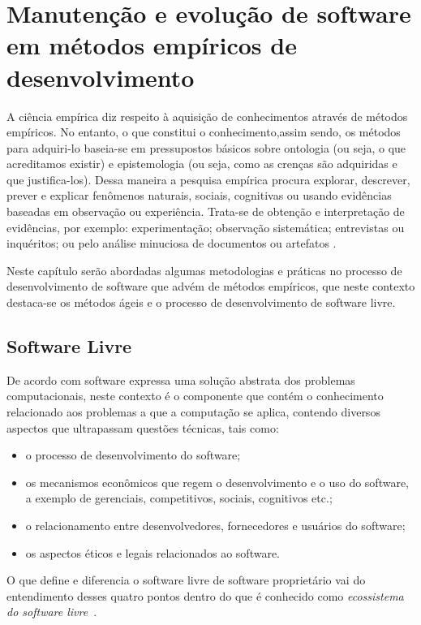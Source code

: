 \section{Manutenção e evolução de software em métodos empíricos de desenvolvimento}

A ciência empírica diz respeito à aquisição de conhecimentos através de métodos empíricos. No entanto, o que constitui o conhecimento,assim sendo, os métodos para adquiri-lo baseia-se em pressupostos básicos sobre ontologia (ou seja, o que acreditamos existir) e epistemologia (ou seja, como as crenças são adquiridas e que justifica-los). Dessa maneira a pesquisa empírica procura explorar, descrever, prever e explicar fenômenos naturais, sociais, cognitivas ou usando evidências baseadas em observação ou experiência. Trata-se de obtenção e interpretação de evidências, por exemplo: experimentação; observação sistemática; entrevistas ou inquéritos; ou pelo análise minuciosa de documentos ou artefatos \cite{sjoberg2007future}.

Neste capítulo serão abordadas algumas metodologias e práticas no processo de desenvolvimento de software que advém de métodos empíricos, que neste contexto destaca-se os métodos ágeis e o processo de desenvolvimento de software livre.

\subsection{Software Livre}
\label{soft-livre}

De acordo com  software expressa uma solução abstrata dos problemas computacionais, neste contexto é o componente que contém o conhecimento relacionado aos problemas a que a computação se aplica, contendo diversos aspectos que ultrapassam questões técnicas, tais como:
\begin{itemize}
\item o processo de desenvolvimento do software;
\item os mecanismos econômicos que regem o desenvolvimento e o uso do software, a exemplo de gerenciais, competitivos, sociais, cognitivos etc.;
\item o relacionamento entre desenvolvedores, fornecedores e usuários do software;
\item os aspectos éticos e legais relacionados ao software.
\end{itemize}

O que define e diferencia o software livre de software proprietário vai do entendimento desses quatro pontos dentro do que é conhecido como \textit{ecossistema do software livre}~\cite{meirelles2013}.

